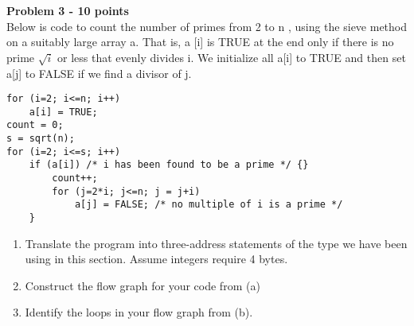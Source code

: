 \documentclass[a4paper, 11pt]{article}
\newenvironment{problem}[2][Problem]
    { \begin{mdframed}[backgroundcolor=gray!20] \textbf{#1 #2} \\}
    {  \end{mdframed}}
\begin{document}
\begin{problem}{3 - 10 points}
Below is code to count the number of primes from 2 to  n , using the sieve method on a suitably large array a. That is, a [i] is TRUE at  the end only if there is no prime $\sqrt i$ or less that evenly divides i. We initialize  all a[i] to TRUE and then set a[j] to FALSE if we find a divisor of j.

\begin{verbatim}
for (i=2; i<=n; i++)    
    a[i] = TRUE;      
count = 0;     
s = sqrt(n);     
for (i=2; i<=s; i++)    
    if (a[i]) /* i has been found to be a prime */ {}  
        count++;    
        for (j=2*i; j<=n; j = j+i)    
            a[j] = FALSE; /* no multiple of i is a prime */  
    }
\end{verbatim}

\begin{enumerate}[a]
    \item Translate the program into three-address statements of the type we have  been using in this section. Assume integers require 4 bytes.
    \item Construct the flow graph for your code from (a)
    \item Identify the loops in your flow graph from (b).

\end{enumerate}
\end{problem}
\end{document}
